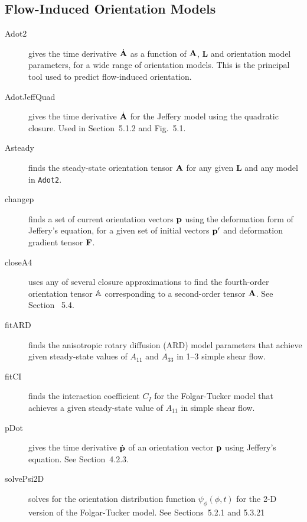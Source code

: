 \documentclass[11pt]{article}
\begin{document}
\subsection{Flow-Induced Orientation Models}

\begin{description}

    \item[Adot2]{gives the time derivative $\dot{\mathbf{A}}$ as a function of $\mathbf{A}$, $\mathbf{L}$ and orientation model parameters, for a wide range of orientation models.  This is the principal tool used to predict flow-induced orientation.}
    
    \item[AdotJeffQuad]{gives the time derivative $\dot{\mathbf{A}}$ for the Jeffery model using the quadratic closure.  Used in Section~5.1.2 and Fig.~5.1.}
    
    \item[Asteady]{finds the steady-state orientation tensor $\mathbf{A}$ for any given $\mathbf{L}$ and any model in \texttt{Adot2}.}
    
    \item[changep]{finds a set of current orientation vectors $\mathbf{p}$ using the deformation form of Jeffery's equation, for a given set of initial vectors $\mathbf{p}'$ and deformation gradient tensor $\mathbf{F}$.}
    
    \item[closeA4]{uses any of several closure approximations to find the fourth-order orientation tensor $\mathbb{A}$ corresponding to a second-order tensor $\mathbf{A}$.  See Section~ 5.4.}  
    
    \item[fitARD]{finds the anisotropic rotary diffusion (ARD) model parameters that achieve given steady-state values of $A_{11}$ and $A_{33}$ in 1--3 simple shear flow.}  
    
    \item[fitCI]{finds the interaction coefficient $C_I$ for the Folgar-Tucker model that achieves a given steady-state value of $A_{11}$ in simple shear flow.}
    
    \item[pDot]{gives the time derivative $\dot{ \mathbf{p}}$ of an orientation vector $\mathbf{p}$ using Jeffery's equation.  See Section~4.2.3.}
    
    \item[solvePsi2D]{solves for the orientation distribution function $\psi_\phi ( \phi, t)$ for the 2-D version of the Folgar-Tucker model.  See Sections~5.2.1 and 5.3.21}
    

\end{description}
\end{document}
